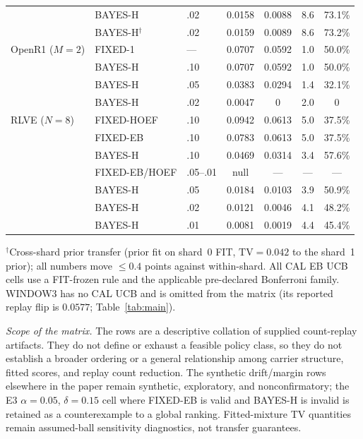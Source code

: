 \documentclass{article}
\theoremstyle{definition}
\theoremstyle{remark}
\begin{document}
\begin{table}[h]
\begin{tabular}{lllcccc}
                    & BAYES-H    & .02 & 0.0158 & 0.0088 & 8.6 & 73.1\% \\
                    & BAYES-H$^\dagger$ & .02 & 0.0159 & 0.0089 & 8.6 & 73.2\% \\
\midrule
OpenR1 ($M{=}2$)    & FIXED-1    & --- & 0.0707 & 0.0592 & 1.0 & 50.0\% \\
                    & BAYES-H    & .10 & 0.0707 & 0.0592 & 1.0 & 50.0\% \\
                    & BAYES-H    & .05 & 0.0383 & 0.0294 & 1.4 & 32.1\% \\
                    & BAYES-H    & .02 & 0.0047 & 0 & 2.0 & 0 \\
\midrule
RLVE ($N{=}8$)      & FIXED-HOEF & .10 & 0.0942 & 0.0613 & 5.0 & 37.5\% \\
                    & FIXED-EB   & .10 & 0.0783 & 0.0613 & 5.0 & 37.5\% \\
                    & BAYES-H    & .10 & 0.0469 & 0.0314 & 3.4 & 57.6\% \\
                    & FIXED-EB/HOEF & .05--.01 & null & --- & --- & --- \\
                    & BAYES-H    & .05 & 0.0184 & 0.0103 & 3.9 & 50.9\% \\
                    & BAYES-H    & .02 & 0.0121 & 0.0046 & 4.1 & 48.2\% \\
                    & BAYES-H    & .01 & 0.0081 & 0.0019 & 4.4 & 45.4\% \\
\bottomrule
\end{tabular}
\vspace{2pt}
\begin{minipage}{\linewidth}\footnotesize
$^\dagger$Cross-shard prior transfer (prior fit on shard~0 FIT,
$\mathrm{TV}{=}0.042$ to the shard~1 prior); all numbers move ${\le}0.4$
points against within-shard. All CAL EB UCB cells use a FIT-frozen rule and
the applicable pre-declared Bonferroni family. WINDOW3 has no CAL UCB and is
omitted from the matrix (its reported replay flip is $0.0577$;
Table~\ref{tab:main}).
\end{minipage}
\end{table}

\emph{Scope of the matrix.} The rows are a descriptive collation of supplied
count-replay artifacts. They do not define or exhaust a feasible policy class,
so they do not establish a broader ordering or a general relationship among
carrier structure, fitted scores, and replay count reduction. The
synthetic drift/margin rows elsewhere in the paper remain synthetic,
exploratory, and nonconfirmatory; the E3 $\alpha=0.05$, $\delta=0.15$ cell
where FIXED-EB is valid and BAYES-H is invalid is retained as a counterexample
to a global ranking. Fitted-mixture TV quantities remain assumed-ball
sensitivity diagnostics, not transfer guarantees.
\end{document}
